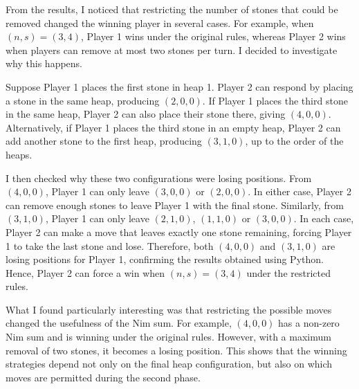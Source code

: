 \documentclass[11pt]{article}
\newcommand{\keywordfont}{\textsc}
\newcommand{\keyword}[1]{%
  \marginpar{\raggedright\small\keywordfont{#1}}}
\begin{document}
\medskip
\keyword{OBSERVE}
From the results, I noticed that restricting
the number of stones that could be removed
changed the winning player in several cases.
For example, when $(n,s)=(3,4)$, Player 1
wins under the original rules, whereas
Player 2 wins when players can remove
at most two stones per turn.
I decided to investigate why this happens.

\smallskip
\keyword{JUSTIFY}
Suppose Player 1 places the first stone in
heap 1. Player 2 can respond by placing a
stone in the same heap, producing $(2,0,0)$.
If Player 1 places the third stone in the
same heap, Player 2 can also place their
stone there, giving $(4,0,0)$.
Alternatively, if Player 1 places the third
stone in an empty heap, Player 2 can add
another stone to the first heap, producing
$(3,1,0)$, up to the order of the heaps.

I then checked why these two configurations
were losing positions.
From $(4,0,0)$, Player 1 can only leave
$(3,0,0)$ or $(2,0,0)$. In either case,
Player 2 can remove enough stones to
leave Player 1 with the final stone.
Similarly, from $(3,1,0)$, Player 1
can only leave $(2,1,0)$, $(1,1,0)$
or $(3,0,0)$.
In each case, Player 2 can make a move
that leaves exactly one stone remaining,
forcing Player 1 to take the last
stone and lose.
Therefore, both $(4,0,0)$ and
$(3,1,0)$ are losing positions for
Player 1, confirming the results
obtained using Python.
Hence, Player 2 can force a win
when $(n,s)=(3,4)$ under the
restricted rules.


\smallskip
\keyword{REFLECT}
What I found particularly interesting was
that restricting the possible moves changed
the usefulness of the Nim sum.
For example, $(4,0,0)$ has a non-zero Nim
sum and is winning under the original
rules. However, with a maximum removal of
two stones, it becomes a losing position.
This shows that the winning strategies
depend not only on the final heap
configuration, but also on which moves
are permitted during the second phase.
\end{document}
